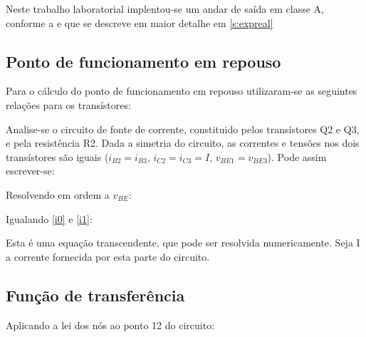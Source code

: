 \documentclass[%
  reprint,
  nofootinbib,
  amsmath,amssymb,
  aps,
  10pt,
  a4paper
]{revtex4-1}
\begin{document}

Neste trabalho laboratorial implentou-se um andar de saída em classe A, conforme a  e que se descreve em maior detalhe em \ref{s:expreal}

\subsection{Ponto de funcionamento em repouso}
Para o cálculo do ponto de funcionamento em repouso utilizaram-se as seguintes relações para os transístores:

Analise-se o circuito de fonte de corrente, constituido pelos transístores Q2 e Q3, e pela resistência R2. Dada a simetria do circuito, as correntes e tensões nos dois transístores são iguais ($i_{B2}=i_{B3}$, $i_{C2}=i_{C3}=I$, $v_{BE1}=v_{BE3}$). Pode assim escrever-se:

Resolvendo em ordem a $v_{BE}$:

Igualando \eqref{i0} e \eqref{i1}:

Esta é uma equação transcendente, que pode ser resolvida numericamente. Seja I a corrente fornecida por esta parte do circuito.

\subsection{Função de transferência}

Aplicando a lei dos nós ao ponto 12 do circuito:


\end{document}
